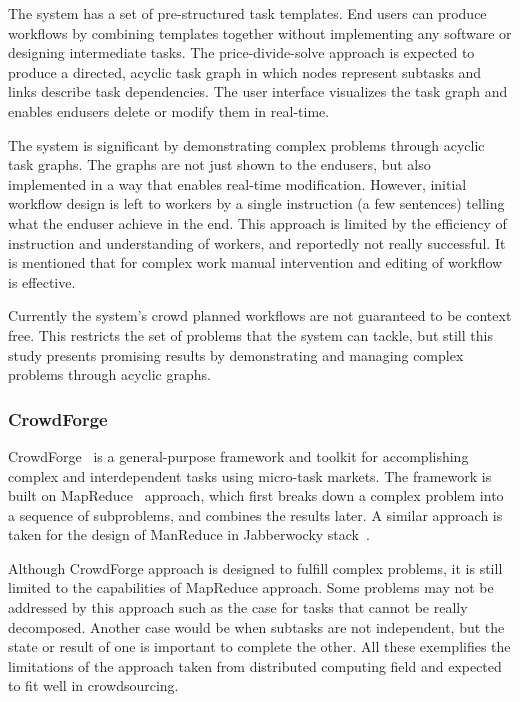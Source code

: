The system has a set of pre-structured task templates. End users can produce 
workflows by combining templates together without implementing any software 
or designing intermediate tasks. The price-divide-solve approach is expected 
to produce a directed, acyclic task graph in which nodes represent subtasks and 
links describe task dependencies. The user interface visualizes the task graph 
and enables endusers delete or modify them in real-time.

The system is significant by demonstrating complex problems through acyclic 
task graphs. The graphs are not just shown to the endusers, but also implemented 
in a way that enables real-time modification. However, initial workflow design 
is left to workers by a single instruction (a few sentences) telling what the enduser 
achieve in the end. This approach is limited by the efficiency of instruction and 
understanding of workers, and reportedly not really successful. It is mentioned 
that for complex work manual intervention and editing of workflow is effective.

Currently the system's crowd planned workflows are not guaranteed to be 
context free. This restricts the set of problems that the system can tackle, 
but still this study presents promising results by demonstrating and managing 
complex problems through acyclic graphs.


\subsubsection{CrowdForge}
CrowdForge~\cite{Kittur2011} is a general-purpose framework and toolkit for 
accomplishing complex and interdependent tasks using micro-task markets. 
The framework is built on MapReduce~\cite{Dean2008} approach, which first breaks 
down a complex problem into a sequence of subproblems, and combines the results 
later. A similar approach is taken for the design of ManReduce in Jabberwocky 
stack~\cite{Ahmad2011}.

Although CrowdForge approach is designed to fulfill complex problems, it is still limited 
to the capabilities of MapReduce approach. Some problems may not be addressed 
by this approach such as the case for tasks that cannot be really decomposed. 
Another case would be when subtasks are not independent, but the state 
or result of one is important to complete the other. All these exemplifies the 
limitations of the approach taken from distributed computing field and 
expected to fit well in crowdsourcing.

